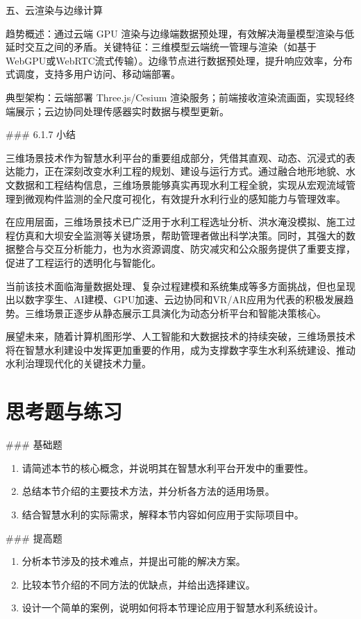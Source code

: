 五、云渲染与边缘计算

趋势概述：通过云端 GPU 渲染与边缘端数据预处理，有效解决海量模型渲染与低延时交互之间的矛盾。关键特征：三维模型云端统一管理与渲染（如基于WebGPU或WebRTC流式传输）。边缘节点进行数据预处理，提升响应效率，分布式调度，支持多用户访问、移动端部署。

典型架构：云端部署 Three.js/Cesium 渲染服务；前端接收渲染流画面，实现轻终端展示；云边协同处理传感器实时数据与模型更新。

\#\#\# 6.1.7 小结

三维场景技术作为智慧水利平台的重要组成部分，凭借其直观、动态、沉浸式的表达能力，正在深刻改变水利工程的规划、建设与运行方式。通过融合地形地貌、水文数据和工程结构信息，三维场景能够真实再现水利工程全貌，实现从宏观流域管理到微观构件监测的全尺度可视化，有效提升水利行业的感知能力与管理效率。

在应用层面，三维场景技术已广泛用于水利工程选址分析、洪水淹没模拟、施工过程仿真和大坝安全监测等关键场景，帮助管理者做出科学决策。同时，其强大的数据整合与交互分析能力，也为水资源调度、防灾减灾和公众服务提供了重要支撑，促进了工程运行的透明化与智能化。

当前该技术面临海量数据处理、复杂过程建模和系统集成等多方面挑战，但也呈现出以数字孪生、AI建模、GPU加速、云边协同和VR/AR应用为代表的积极发展趋势。三维场景正逐步从静态展示工具演化为动态分析平台和智能决策核心。

展望未来，随着计算机图形学、人工智能和大数据技术的持续突破，三维场景技术将在智慧水利建设中发挥更加重要的作用，成为支撑数字孪生水利系统建设、推动水利治理现代化的关键技术力量。

\section{思考题与练习}

\#\#\# 基础题

\begin{enumerate}
\def\labelenumi{\arabic{enumi}.}
\tightlist
\item
  请简述本节的核心概念，并说明其在智慧水利平台开发中的重要性。
\item
  总结本节介绍的主要技术方法，并分析各方法的适用场景。
\item
  结合智慧水利的实际需求，解释本节内容如何应用于实际项目中。
\end{enumerate}

\#\#\# 提高题

\begin{enumerate}
\def\labelenumi{\arabic{enumi}.}
\setcounter{enumi}{3}
\tightlist
\item
  分析本节涉及的技术难点，并提出可能的解决方案。
\item
  比较本节介绍的不同方法的优缺点，并给出选择建议。
\item
  设计一个简单的案例，说明如何将本节理论应用于智慧水利系统设计。
\end{enumerate}

